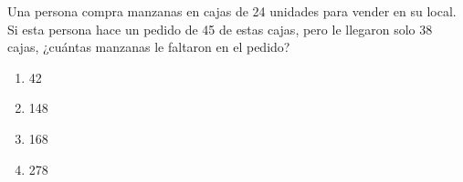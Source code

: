 \begin{problem}
    Una persona compra manzanas en cajas de 24 unidades para vender en su local. Si esta persona hace un pedido de 45 de estas cajas, pero le llegaron solo 38 cajas, ¿cuántas manzanas le faltaron en el pedido?

    \begin{enumerate}[label=\Alph*.]
        \item 42
        \item 148
        \item 168
        \item 278
    \end{enumerate}
\end{problem}
